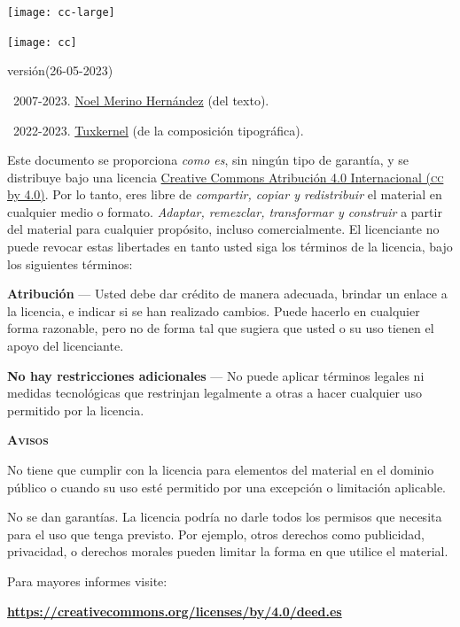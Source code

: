 \documentclass[14pt,twoside,final]{extbook} %
\begin{document}
\newpage
\pagestyle{empty}
\vspace*{0pt}
\vfill
\begin{scriptsize}
\begin{flushleft}
\begin{minipage}{7.5cm}
\texttt{[image: cc-large]}\label{fig:cc-large} \medskip

\texttt{[image: cc]}\label{fig:cc} \medskip

\def\fileversion{1.023}
\def\filedate{(26-05-2023)}
versión\space\fileversion\space\filedate \medskip

\textcopyright\ 2007-2023. \href{noel_merino@yahoo.com.mx}{Noel Merino Hernández} (del texto).

\textcopyright\ 2022-2023. \href{muxkernel@gmail.com}{Tuxkernel} (de la composición tipográfica). \medskip

Este documento se proporciona \emph{como es}, sin ningún tipo de garantía, y se distribuye bajo una licencia \href{https://creativecommons.org/licenses/by/4.0/deed.es}{Creative Commons Atribución 4.0 Internacional (\textsc{cc} by 4.0)}. Por lo tanto, eres libre de \emph{compartir, copiar y redistribuir} el material en cualquier medio o formato. \emph{Adaptar, remezclar, transformar y construir} a partir del material para cualquier propósito, incluso comercialmente. El licenciante no puede revocar estas libertades en tanto usted siga los términos de la licencia, bajo los siguientes términos: \medskip

\textbf{Atribución} --- Usted debe dar crédito de manera adecuada, brindar un enlace a la licencia, e indicar si se han realizado cambios. Puede hacerlo en cualquier forma razonable, pero no de forma tal que sugiera que usted o su uso tienen el apoyo del licenciante. \medskip

\textbf{No hay restricciones adicionales} --- No puede aplicar términos legales ni medidas tecnológicas que restrinjan legalmente a otras a hacer cualquier uso permitido por la licencia. \medskip

\textbf{\textsc{Avisos}} \medskip

No tiene que cumplir con la licencia para elementos del material en el dominio público o cuando su uso esté permitido por una excepción o limitación aplicable. \medskip

No se dan garantías. La licencia podría no darle todos los permisos que necesita para el uso que tenga previsto. Por ejemplo, otros derechos como publicidad, privacidad, o derechos morales pueden limitar la forma en que utilice el material. \medskip

Para mayores informes visite: \medskip

\textbf{\url{https://creativecommons.org/licenses/by/4.0/deed.es}}
\end{minipage}
\end{flushleft}
\end{scriptsize}
\end{document}
